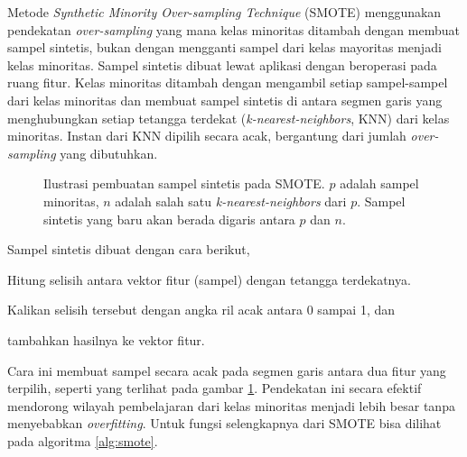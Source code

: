 Metode \textit{Synthetic Minority Over-sampling Technique} (SMOTE)
\cite{chawla2002smote} menggunakan pendekatan \textit{over-sampling} yang mana
kelas minoritas ditambah dengan membuat sampel sintetis, bukan dengan
mengganti sampel dari kelas mayoritas menjadi kelas minoritas.
Sampel sintetis dibuat lewat aplikasi dengan beroperasi pada
ruang fitur.
Kelas minoritas ditambah dengan mengambil setiap sampel-sampel dari kelas
minoritas dan membuat sampel sintetis di antara segmen garis yang menghubungkan
setiap tetangga terdekat (\textit{k-nearest-neighbors}, KNN) dari kelas
minoritas.
Instan dari KNN dipilih secara acak, bergantung dari jumlah
\textit{over-sampling} yang dibutuhkan.

\begin{figure}[htbp]
\centering
\setlength\fboxsep{4pt}
	\caption{
	Ilustrasi pembuatan sampel sintetis pada SMOTE.
	$p$ adalah sampel minoritas, $n$ adalah salah satu
	\textit{k-nearest-neighbors} dari $p$.
	Sampel sintetis yang baru akan berada digaris antara $p$ dan $n$.
	}
	\label{fig:smote}
\end{figure}

Sampel sintetis dibuat dengan cara berikut,
\begin{compactitem}%
	\item Hitung selisih antara vektor fitur (sampel) dengan tetangga
	terdekatnya.
	\item Kalikan selisih tersebut dengan angka ril acak antara 0 sampai 1,
	dan
	\item tambahkan hasilnya ke vektor fitur.
\end{compactitem}

Cara ini membuat sampel secara acak pada segmen garis antara dua fitur yang
terpilih, seperti yang terlihat pada gambar \ref{fig:smote}.
Pendekatan ini secara efektif mendorong wilayah pembelajaran dari kelas
minoritas menjadi lebih besar tanpa menyebabkan \textit{overfitting}.
Untuk fungsi selengkapnya dari SMOTE bisa dilihat pada algoritma
\ref{alg:smote}.

